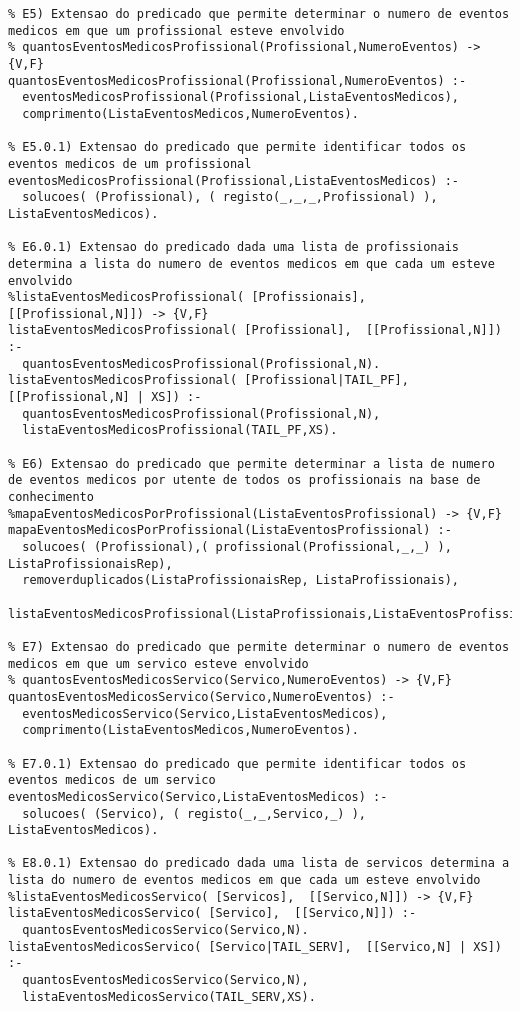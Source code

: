 \documentclass[
  oneside,
  10pt, a4paper,
  footinclude=true,
  headinclude=true,
  cleardoublepage=empty
]{scrbook}
\begin{document}
\begin{lstlisting}
% E5) Extensao do predicado que permite determinar o numero de eventos medicos em que um profissional esteve envolvido 
% quantosEventosMedicosProfissional(Profissional,NumeroEventos) -> {V,F}
quantosEventosMedicosProfissional(Profissional,NumeroEventos) :-
  eventosMedicosProfissional(Profissional,ListaEventosMedicos),
  comprimento(ListaEventosMedicos,NumeroEventos).

% E5.0.1) Extensao do predicado que permite identificar todos os eventos medicos de um profissional 
eventosMedicosProfissional(Profissional,ListaEventosMedicos) :-
  solucoes( (Profissional), ( registo(_,_,_,Profissional) ), ListaEventosMedicos).

% E6.0.1) Extensao do predicado dada uma lista de profissionais determina a lista do numero de eventos medicos em que cada um esteve envolvido 
%listaEventosMedicosProfissional( [Profissionais],  [[Profissional,N]]) -> {V,F}
listaEventosMedicosProfissional( [Profissional],  [[Profissional,N]]) :- 
  quantosEventosMedicosProfissional(Profissional,N).
listaEventosMedicosProfissional( [Profissional|TAIL_PF],  [[Profissional,N] | XS]) :- 
  quantosEventosMedicosProfissional(Profissional,N),
  listaEventosMedicosProfissional(TAIL_PF,XS).

% E6) Extensao do predicado que permite determinar a lista de numero de eventos medicos por utente de todos os profissionais na base de conhecimento 
%mapaEventosMedicosPorProfissional(ListaEventosProfissional) -> {V,F} 
mapaEventosMedicosPorProfissional(ListaEventosProfissional) :- 
  solucoes( (Profissional),( profissional(Profissional,_,_) ), ListaProfissionaisRep),
  removerduplicados(ListaProfissionaisRep, ListaProfissionais),
  listaEventosMedicosProfissional(ListaProfissionais,ListaEventosProfissional).

% E7) Extensao do predicado que permite determinar o numero de eventos medicos em que um servico esteve envolvido 
% quantosEventosMedicosServico(Servico,NumeroEventos) -> {V,F}
quantosEventosMedicosServico(Servico,NumeroEventos) :-
  eventosMedicosServico(Servico,ListaEventosMedicos),
  comprimento(ListaEventosMedicos,NumeroEventos).

% E7.0.1) Extensao do predicado que permite identificar todos os eventos medicos de um servico
eventosMedicosServico(Servico,ListaEventosMedicos) :-
  solucoes( (Servico), ( registo(_,_,Servico,_) ), ListaEventosMedicos).

% E8.0.1) Extensao do predicado dada uma lista de servicos determina a lista do numero de eventos medicos em que cada um esteve envolvido 
%listaEventosMedicosServico( [Servicos],  [[Servico,N]]) -> {V,F}
listaEventosMedicosServico( [Servico],  [[Servico,N]]) :- 
  quantosEventosMedicosServico(Servico,N).
listaEventosMedicosServico( [Servico|TAIL_SERV],  [[Servico,N] | XS]) :- 
  quantosEventosMedicosServico(Servico,N),
  listaEventosMedicosServico(TAIL_SERV,XS).


\end{lstlisting}
\end{document}
